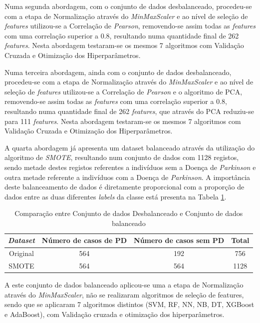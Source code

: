 \documentclass[12pt,a4paper,twoside]{report}
\begin{document}
{Numa segunda abordagem, com o conjunto de dados desbalanceado, procedeu-se com a etapa de Normalização através do \textit{MinMaxScaler} e ao nível de seleção de \textit{features} utilizou-se a Correlação de \textit{Pearson}, removendo-se assim todas as \textit{features} com uma correlação superior a 0.8, resultando numa quantidade final de 262 \textit{features}.  Nesta abordagem testaram-se os mesmos 7 algoritmos com Validação Cruzada e Otimização dos Hiperparâmetros.

Numa terceira abordagem, ainda com o conjunto de dados desbalanceado, procedeu-se com a etapa de Normalização através do \textit{MinMaxScaler} e ao nível de seleção de \textit{features} utilizou-se a Correlação de \textit{Pearson} e o algoritmo de \gls{PCA}, removendo-se assim todas as \textit{features} com uma correlação superior a 0.8, resultando numa quantidade final de 262 \textit{features}, que através do \gls{PCA} reduziu-se para 111 \textit{features}.  Nesta abordagem testaram-se os mesmos 7 algoritmos com Validação Cruzada e Otimização dos Hiperparâmetros.

A quarta abordagem já apresenta um dataset balanceado através da utilização do algoritmo de \textit{SMOTE}, resultando num conjunto de dados com 1128 registos, sendo metade destes registos referentes a indivíduos sem a Doença de \textit{Parkinson} e outra metade referente a indivíduos com a Doença de \textit{Parkinson}. A importância deste balanceamento de dados é diretamente proporcional com a proporção de dados entre as duas diferentes \textit{labels} da classe está presenta na Tabela \ref{smotetable}.

\begin{table}[H]
\caption{Comparação entre Conjunto de dados Desbalanceado e Conjunto de dados balanceado}
\label{smotetable}
\centering
\begin{tabular}{cccc}
\toprule
\textbf{\textit{Dataset}}	& \textbf{Número de casos de PD} &  \textbf{Número de casos sem PD} &\textbf{Total} \\
\midrule
Original & 564 & 192 & 756 \\
\gls{SMOTE} & 564 &	564 & 1128	\\
\bottomrule
\end{tabular}
\end{table}


A este conjunto de dados balanceado aplicou-se uma a etapa de Normalização através do \textit{MinMaxScaler}, não se realizaram algoritmos de seleção de features, sendo que se aplicaram 7 algoritmos distintos (\gls{SVM}, \Gls{RF}, \gls{NN}, \gls{NB}, \Gls{DT}, \Gls{XGBoost} e \gls{AdaBoost}), com Validação cruzada e otimização dos hiperparâmetros.

}
\end{document}
